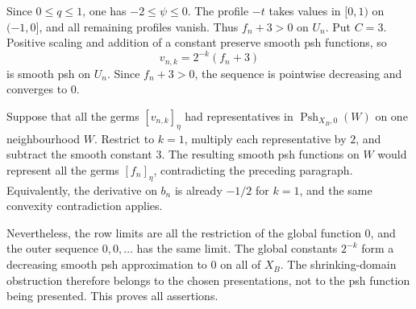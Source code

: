 Since \(0\leq q\leq1\), one has \(-2\leq\psi\leq0\). The profile \(-t\)
takes values in \([0,1)\) on \((-1,0]\), and all remaining profiles
vanish. Thus \(f_n+3>0\) on \(U_n\). Put \(C=3\). Positive scaling and
addition of a constant preserve smooth psh functions, so
\[
                         v_{n,k}=2^{-k}(f_n+3)
\]
is smooth psh on \(U_n\). Since \(f_n+3>0\), the sequence is pointwise
decreasing and converges to \(0\).

Suppose that all the germs \([v_{n,k}]_\eta\) had representatives in
\(\operatorname{Psh}_{X_B,0}(W)\) on one neighbourhood \(W\). Restrict
to \(k=1\), multiply each representative by \(2\), and subtract the
smooth constant \(3\). The resulting smooth psh functions on \(W\) would
represent all the germs \([f_n]_\eta\), contradicting the preceding
paragraph. Equivalently, the derivative on \(b_n\) is already
\(-1/2\) for \(k=1\), and the same convexity contradiction applies.

Nevertheless, the row limits are all the restriction of the global
function \(0\), and the outer sequence \(0,0,\ldots\) has the same limit.
The global constants \(2^{-k}\) form a decreasing smooth psh approximation
to \(0\) on all of \(X_B\). The shrinking-domain obstruction therefore
belongs to the chosen presentations, not to the psh function being
presented. This proves all assertions.
